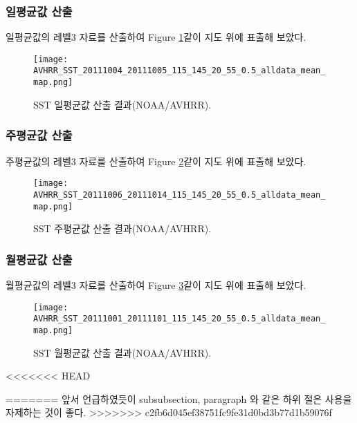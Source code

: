 \subsubsection{일평균값 산출}

일평균값의 레벨3 자료를 산출하여 Figure \ref{fig:daily_mean1}\과 같이 지도 위에 표출해 보았다. 

\begin{figure}[htbp]
	\centerline{\texttt{[image: AVHRR\_SST\_20111004\_20111005\_115\_145\_20\_55\_0.5\_alldata\_mean\_map.png]}}
	\caption{SST 일평균값 산출 결과(NOAA/AVHRR).}
	\label{fig:daily_mean1}
\end{figure}

\newpage
\subsubsection{주평균값 산출}

주평균값의 레벨3 자료를 산출하여 Figure \ref{fig:weekly_mean1}\과 같이 지도 위에 표출해 보았다. 

\begin{figure}[htbp]
	\centerline{\texttt{[image: AVHRR\_SST\_20111006\_20111014\_115\_145\_20\_55\_0.5\_alldata\_mean\_map.png]}}
	\caption{SST 주평균값 산출 결과(NOAA/AVHRR).}
	\label{fig:weekly_mean1}
\end{figure}

\newpage
\subsubsection{월평균값 산출}

월평균값의 레벨3 자료를 산출하여 Figure \ref{fig:monthly_mean1}\과 같이 지도 위에 표출해 보았다. 

\begin{figure}[htbp]
	\centerline{\texttt{[image: AVHRR\_SST\_20111001\_20111101\_115\_145\_20\_55\_0.5\_alldata\_mean\_map.png]}}
	\caption{SST 월평균값 산출 결과(NOAA/AVHRR).}
	\label{fig:monthly_mean1}
\end{figure}


<<<<<<< HEAD


=======
앞서 언급하였듯이 subsubsection, paragraph 와 같은 하위 절은 사용을 자제하는 것이 좋다.
>>>>>>> c2fb6d045ef38751fc9fe31d0bd3b77d1b59076f
